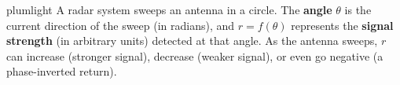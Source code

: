 \documentclass[10pt]{article}
\begin{document}
\namepartnerperiod

\vspace{0.10in}

\begin{scenariobox}{plumlight}
A radar system sweeps an antenna in a circle. The \textbf{angle} $\theta$ is the
current direction of the sweep (in radians), and $r = f(\theta)$ represents the
\textbf{signal strength} (in arbitrary units) detected at that angle. As the antenna
sweeps, $r$ can increase (stronger signal), decrease (weaker signal), or even
go negative (a phase-inverted return).
\end{scenariobox}

\vspace{0.08in}
\end{document}
